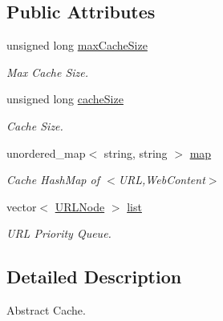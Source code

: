 \subsection*{\-Public \-Attributes}
\begin{DoxyCompactItemize}
\item 
\hypertarget{classAbstractCache_a5db4a215715082ca927f75fec6fe274c}{unsigned long \hyperlink{classAbstractCache_a5db4a215715082ca927f75fec6fe274c}{max\-Cache\-Size}}\label{classAbstractCache_a5db4a215715082ca927f75fec6fe274c}

\begin{DoxyCompactList}\small\item\em \-Max \-Cache \-Size. \end{DoxyCompactList}\item 
\hypertarget{classAbstractCache_a3b7d8e12031d428787a75852370631e2}{unsigned long \hyperlink{classAbstractCache_a3b7d8e12031d428787a75852370631e2}{cache\-Size}}\label{classAbstractCache_a3b7d8e12031d428787a75852370631e2}

\begin{DoxyCompactList}\small\item\em \-Cache \-Size. \end{DoxyCompactList}\item 
\hypertarget{classAbstractCache_a4ee0357340f21b0989bc8764db0fabce}{unordered\-\_\-map$<$ string, string $>$ \hyperlink{classAbstractCache_a4ee0357340f21b0989bc8764db0fabce}{map}}\label{classAbstractCache_a4ee0357340f21b0989bc8764db0fabce}

\begin{DoxyCompactList}\small\item\em \-Cache \-Hash\-Map of $<$\-U\-R\-L,\-Web\-Content$>$ \end{DoxyCompactList}\item 
\hypertarget{classAbstractCache_abe36acc627f10c65bfd04e3833011d7b}{vector$<$ \hyperlink{classURLNode}{\-U\-R\-L\-Node} $>$ \hyperlink{classAbstractCache_abe36acc627f10c65bfd04e3833011d7b}{list}}\label{classAbstractCache_abe36acc627f10c65bfd04e3833011d7b}

\begin{DoxyCompactList}\small\item\em \-U\-R\-L \-Priority \-Queue. \end{DoxyCompactList}\end{DoxyCompactItemize}


\subsection{\-Detailed \-Description}
\-Abstract \-Cache. 

